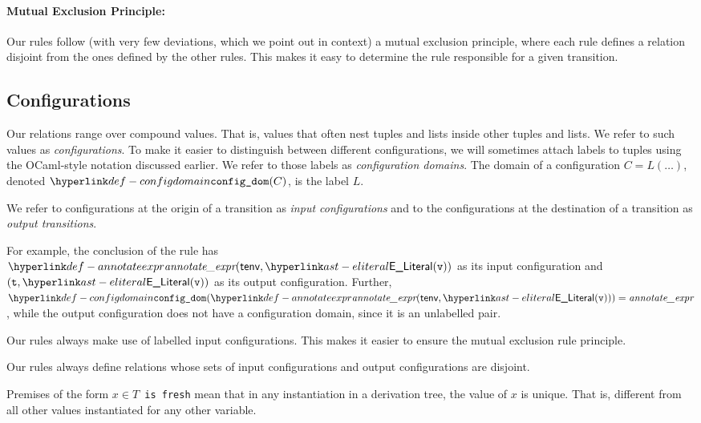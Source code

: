 \paragraph{Mutual Exclusion Principle:}
Our rules follow (with very few deviations, which we point out
in context) a mutual exclusion principle, where each rule
defines a relation disjoint from the ones defined by the other
rules.  This makes it easy to determine the rule responsible
for a given transition.

\hypertarget{def-configuration}{}
\subsection{Configurations}

\hypertarget{def-configdomain}{}
Our relations range over compound values. That is, values that often nest tuples and lists inside other tuples and lists.
We refer to such values as \emph{configurations}. To make it easier to distinguish between different configurations,
we will sometimes attach labels to tuples using the OCaml-style notation discussed earlier.
We refer to those labels as \emph{configuration domains}.
The domain of a configuration $C=L(\ldots)$, denoted $\configdomain{C}$, is the label $L$.

We refer to configurations at the origin of a transition as \emph{input configurations} and to the
configurations at the destination of a transition as \emph{output transitions}.

For example, the conclusion of the rule  has \\
$\annotateexpr{\tenv, \ELiteral(\vv)}$ as its input configuration
and $(\vt, \ELiteral(\vv))$ as its output configuration.
Further, \\
$\configdomain{\annotateexpr{\tenv, \ELiteral(\vv)}} = \textit{annotate\_expr}$,
while the output configuration does not have a configuration domain, since it is an unlabelled pair.

Our rules always make use of labelled input configurations. This makes it easier to ensure
the mutual exclusion rule principle.

Our rules always define relations whose sets of input configurations and output configurations are disjoint.

\hypertarget{def-freshvariables}{}
\begin{definition}
  Premises of the form \texttt{$x\in T$ is fresh} mean that in any
  instantiation in a derivation tree, the value of $x$ is unique.
  That is, different from all other values instantiated for any other variable.
\end{definition}

